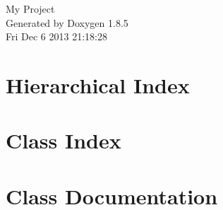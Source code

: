 \documentclass[twoside]{book}
\newcommand{\clearemptydoublepage}{%
  \newpage{\pagestyle{empty}\cleardoublepage}%
}
\begin{document}
\hypersetup{pageanchor=false}
\begin{titlepage}
\vspace*{7cm}
\begin{center}%
{\Large My Project }\\
\vspace*{1cm}
{\large Generated by Doxygen 1.8.5}\\
\vspace*{0.5cm}
{\small Fri Dec 6 2013 21:18:28}\\
\end{center}
\end{titlepage}
\clearemptydoublepage
\tableofcontents
\clearemptydoublepage
{}
\hypersetup{pageanchor=true}

\chapter{Hierarchical Index}

\chapter{Class Index}

\chapter{Class Documentation}














































\newpage
{}
{}
\printindex
\end{document}
